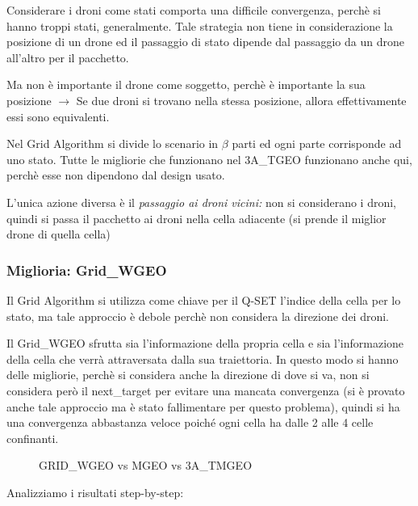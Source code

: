 \documentclass[12pt]{article}
\begin{document}
Considerare i droni come stati comporta una difficile convergenza, perchè si hanno troppi stati, generalmente. Tale strategia non tiene in considerazione la posizione di un drone ed il passaggio di stato dipende dal passaggio da un drone all'altro per il pacchetto.

Ma non è importante il drone come soggetto, perchè è importante la sua posizione $\rightarrow$ Se due droni si trovano nella stessa posizione, allora effettivamente essi sono equivalenti.

Nel Grid Algorithm si divide lo scenario in $\beta$ parti ed ogni parte corrisponde ad uno stato. Tutte le migliorie che funzionano nel 3A\_TGEO funzionano anche qui, perchè esse non dipendono dal design usato.

L'unica azione diversa è il \textit{passaggio ai droni vicini:} non si considerano i droni, quindi si passa il pacchetto ai droni nella cella adiacente (si prende il miglior drone di quella cella)


\subsubsection{Miglioria: Grid\_WGEO}

Il Grid Algorithm si utilizza come chiave per il Q-SET l'indice della cella per lo stato, ma tale approccio è debole perchè non considera la direzione dei droni.

Il Grid\_WGEO sfrutta sia l'informazione della propria cella e sia l'informazione della cella che verrà attraversata dalla sua traiettoria. In questo modo si hanno delle migliorie, perchè si considera anche la direzione di dove si va, non si considera però il next\_target per evitare una mancata convergenza (si è provato anche tale approccio ma è stato fallimentare per questo problema), quindi si ha una convergenza abbastanza veloce poiché ogni cella ha dalle 2 alle 4 celle confinanti.


\begin{figure}[H]
    
    \qquad
    \caption{GRID\_WGEO vs MGEO vs 3A\_TMGEO}%
    \label{fig:example}%
\end{figure}


Analizziamo i risultati step-by-step:
\end{document}
